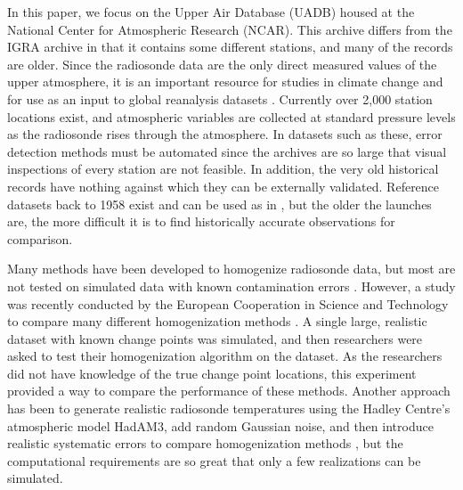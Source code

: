 \documentclass[12pt]{article}
\begin{document}
\begin{doublespacing}
In this paper, we  focus on the Upper Air Database (UADB) housed at the National Center for Atmospheric Research (NCAR). This archive differs from the IGRA archive in that it contains some different stations, and many of the records are older. Since the radiosonde data are the only direct measured values of the upper atmosphere, it is an important resource for studies in climate change \cite{elliott91, eskridge95} and for use as an input to global reanalysis datasets \cite{kalnay96, kanamitsu02}. Currently over 2,000 station locations exist, and atmospheric variables are collected at standard pressure levels as the radiosonde rises through the atmosphere. In  datasets such as these,  error detection methods must be automated since the archives are so large that visual inspections of every station are not feasible.  In addition, the very old historical records have nothing against which they can be  externally validated.  Reference datasets back to 1958 exist and can be used as in  \cite{haimberger07, haimberger12}, but the older the launches are, the more difficult it is to find historically accurate observations for comparison.  

Many methods have been developed to homogenize radiosonde data, but most are not tested on simulated data with known contamination errors \cite{eskridge95, haimberger07, haimberger12, lanzante96, lanzante03, venema12}.  However, a study was recently conducted by the European Cooperation in Science and Technology to compare many different homogenization methods \cite{venema12}.  A single large, realistic dataset with known change points was simulated, and then researchers were asked to test their homogenization algorithm on the dataset.  As the researchers did not have knowledge of the true change point locations, this experiment provided a way to compare the performance of  these  methods.  Another approach has been to generate realistic radiosonde temperatures using the Hadley Centre's atmospheric model HadAM3, add random Gaussian noise, and then introduce realistic systematic errors to compare homogenization methods \cite{titchner09, thorne11}, but the computational requirements are so great that only a few  realizations can be simulated.


\end{doublespacing}
\end{document}
